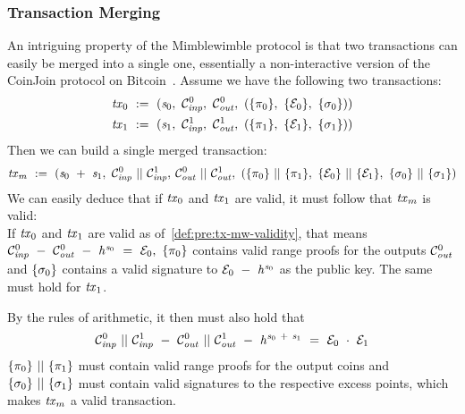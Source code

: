 \subsubsection{Transaction Merging \label{sec:pre:mimblewimble:merge}}
An intriguing property of the Mimblewimble protocol is that two transactions can easily be merged into a single one, essentially a non-interactive version of the CoinJoin protocol on Bitcoin~\cite{maxwell2013coinjoin}.
Assume we have the following two transactions:
\begin{gather*}
    \mathit{tx}_0 ~:=~ (\mathit{s}_0 ,~ \mathcal{C}_{\mathit{inp}}^0 ,~ \mathcal{C}_{\mathit{out}}^0 ,~ (\{\pi_0\} ,~ \{\mathcal{E}_0\} ,~ \{\sigma_0\}) )\\
    \mathit{tx}_1 ~:=~ (\mathit{s}_1 ,~ \mathcal{C}_{\mathit{inp}}^1 ,~ \mathcal{C}_{\mathit{out}}^1 ,~ (\{\pi_1\} ,~ \{\mathcal{E}_1\} ,~ \{\sigma_1\}) )\\
\end{gather*}
Then we can build a single merged transaction:
\[ \mathit{tx}_m ~:=~ (\mathit{s}_0 ~+~ \mathit{s}_1 ,~ \mathcal{C}_{\mathit{inp}}^0 ~||~ \mathcal{C}_{\mathit{inp}}^1,\:\mathcal{C}_{\mathit{out}}^0 ~||~ \mathcal{C}_{\mathit{out}}^1 ,~ (\{\pi_0\} ~||~ \{\pi_1\} ,~
\{\mathcal{E}_0\} ~||~ \{\mathcal{E}_1\} ,~ \{\sigma_0\} ~||~ \{\sigma_1\}) \]
We can easily deduce that if $\mathit{tx}_0$ and $\mathit{tx}_1$ are valid, it must follow that $\mathit{tx}_m$ is valid:\\
If $\mathit{tx}_0$ and $\mathit{tx}_1$ are valid as of~\cref{def:pre:tx-mw-validity}, that means $\mathcal{C}_{\mathit{inp}}^0 ~-~ \mathcal{C}_{\mathit{out}}^0 ~-~ \mathit{h}^{\mathit{s}_0} ~=~ \mathcal{E}_0 ,~ \{\pi_0\}$ contains valid range proofs for the outputs $\mathcal{C}_{\mathit{out}}^0$ and $\{\sigma_0\}$ contains a valid signature to $\mathcal{E}_0 ~-~ \mathit{h}^{\mathit{s}_0}$ as the public key.
The same must hold for $\mathit{tx}_1$.

By the rules of arithmetic, it then must also hold that
\[ \mathcal{C}_{\mathit{inp}}^0 ~||~ \mathcal{C}_{\mathit{inp}}^1 ~-~ \mathcal{C}_{\mathit{out}}^0 ~||~ \mathcal{C}_{\mathit{out}}^1 ~-~ \mathit{h}^{\mathit{s}_0 ~+~ \mathit{s}_1} ~=~ \mathcal{E}_0 ~\cdot~ \mathcal{E}_1  \]
$\{\pi_0\} ~||~ \{\pi_1\}$ must contain valid range proofs for the output coins and $\{\sigma_0\} ~||~ \{\sigma_1\}$ must contain valid signatures to the respective excess points, which makes $\mathit{tx}_m$ a valid transaction.

